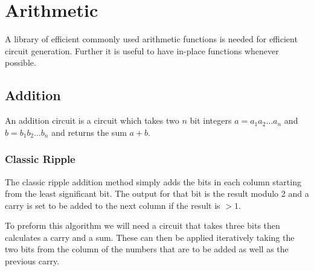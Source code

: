 \chapter{Arithmetic}

A library of efficient commonly used arithmetic functions is needed for efficient circuit generation.
Further it is useful to have in-place functions whenever possible. 

\section{Addition}
  An addition circuit is a circuit which takes two $n$ bit integers $a = a_1a_2\dotsc a_n$ and $b = b_1b_2\dotsc b_n$ and returns the sum $a+b$. 
  \subsection{Classic Ripple} 
    The classic ripple addition method simply adds the bits in each column starting from the least significant bit.
    The output for that bit is the result modulo 2 and a carry is set to be added to the next column if the result is $>1$.

    To preform this algorithm we will need a circuit that takes three bits then calculates a carry and a sum.
    These can then be applied iteratively taking the two bits from the column of the numbers that are to be added as well as the previous carry.
    
